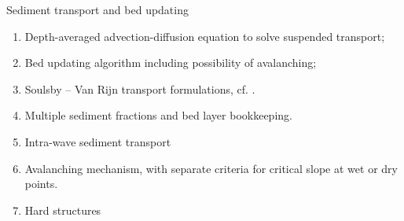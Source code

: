 Sediment transport and bed updating

\begin{enumerate}
  \item  Depth-averaged advection-diffusion equation to solve suspended transport; 
  \item  Bed updating algorithm including possibility of avalanching;
  \item  Soulsby -- Van Rijn transport formulations, cf. \citet{Reniers2004}.
  \item  Multiple sediment fractions and bed layer bookkeeping. 
  \item  Intra-wave sediment transport
  \item  Avalanching mechanism, with separate criteria for critical slope at wet or dry points.
  \item  Hard structures
\end{enumerate}


